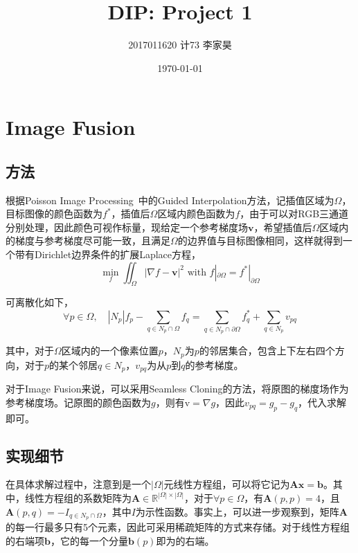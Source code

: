 \documentclass[12pt,a4paper]{article}
\title{DIP: Project 1}
\author{2017011620 \quad 计73 \quad 李家昊}
\date{\today}
\begin{document}
\maketitle

\section{Image Fusion}

\subsection{方法}

根据Poisson Image Processing~\cite{perez2003poisson}中的Guided Interpolation方法，记插值区域为$\Omega$，目标图像的颜色函数为$f^*$，插值后$\Omega$区域内颜色函数为$f$，由于可以对RGB三通道分别处理，因此颜色可视作标量，现给定一个参考梯度场$\mathbf{v}$，希望插值后$\Omega$区域内的梯度与参考梯度尽可能一致，且满足$\Omega$的边界值与目标图像相同，这样就得到一个带有Dirichlet边界条件的扩展Laplace方程，
\begin{equation}\label{eq:continuous}
    \min_{f} \iint_\Omega | \nabla f - \mathbf{v}|^2 \text{ with } f|_{\partial \Omega} = f^*|_{\partial \Omega}
\end{equation}

可离散化如下，
\begin{equation}\label{eq:discrete}
    \forall p \in \Omega, \quad |N_p|f_p - \sum_{q\in N_p \cap \Omega} f_q = \sum_{q \in N_p \cap \partial \Omega} f_q^* + \sum_{q\in N_p} v_{pq}
\end{equation}

其中，对于$\Omega$区域内的一个像素位置$p$，$N_p$为$p$的邻居集合，包含上下左右四个方向，对于$p$的某个邻居$q \in N_p$，$v_{pq}$为从$p$到$q$的参考梯度。

对于Image Fusion来说，可以采用Seamless Cloning的方法，将原图的梯度场作为参考梯度场。记原图的颜色函数为$g$，则有$\mathrm{v} = \nabla g$，因此$v_{pq} = g_p - g_q$，代入求解即可。

\subsection{实现细节}

在具体求解过程中，注意到是一个$|\Omega|$元线性方程组，可以将它记为$\mathbf{Ax} = \mathbf{b}$。其中，线性方程组的系数矩阵为$\mathbf{A}\in \mathbb{R}^{|\Omega|\times |\Omega|}$，对于$\forall p \in \Omega$，有$\mathbf{A}(p,p)=4$，且$\mathbf{A}(p,q)=-I_{q\in N_p\cap \Omega}$，其中$I$为示性函数。事实上，可以进一步观察到，矩阵$\mathbf{A}$的每一行最多只有5个元素，因此可采用稀疏矩阵的方式来存储。对于线性方程组的右端项$\mathbf{b}$，它的每一个分量$\mathbf{b}(p)$即为的右端。
\end{document}
